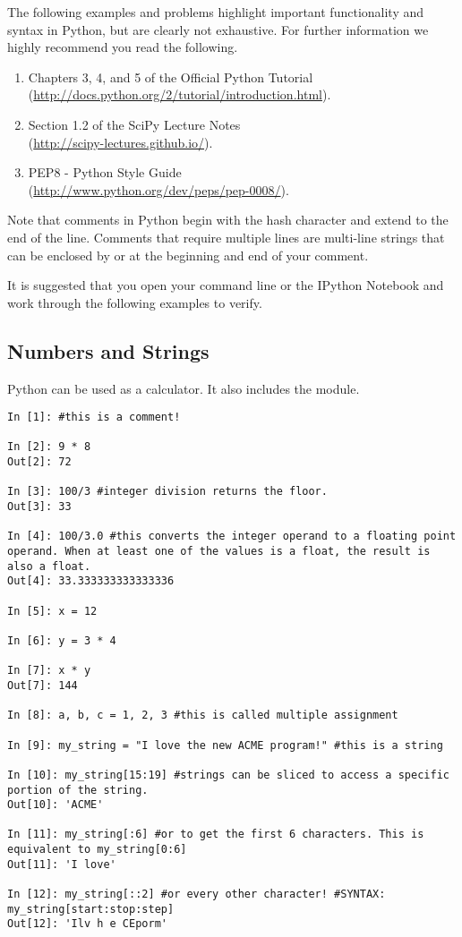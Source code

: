 The following examples and problems highlight important functionality
and syntax in Python, but are clearly not exhaustive.
For further information we highly recommend you read the following.
\begin{enumerate}
\item Chapters 3, 4, and 5 of the Official Python Tutorial \\
        (\url{http://docs.python.org/2/tutorial/introduction.html}).
\item Section 1.2 of the SciPy Lecture Notes \\
        (\url{http://scipy-lectures.github.io/}).
\item PEP8 - Python Style Guide \\
        (\url{http://www.python.org/dev/peps/pep-0008/}).
\end{enumerate}

Note that comments in Python begin with the hash character \li{#} 
and extend to the end of the line. Comments that require multiple
lines are multi-line strings that can be enclosed by  or  at the beginning 
and end of your comment. 


It is suggested that you open your command line or the IPython Notebook 
and work through the following examples to verify. 

\subsection*{Numbers and Strings}

\begin{example}
Python can be used as a calculator. It also 
includes the  module.

\begin{lstlisting}
In [1]: #this is a comment!

In [2]: 9 * 8
Out[2]: 72

In [3]: 100/3 #integer division returns the floor.
Out[3]: 33

In [4]: 100/3.0 #this converts the integer operand to a floating point operand. When at least one of the values is a float, the result is also a float. 
Out[4]: 33.333333333333336

In [5]: x = 12

In [6]: y = 3 * 4

In [7]: x * y
Out[7]: 144

In [8]: a, b, c = 1, 2, 3 #this is called multiple assignment

In [9]: my_string = "I love the new ACME program!" #this is a string

In [10]: my_string[15:19] #strings can be sliced to access a specific portion of the string.
Out[10]: 'ACME'

In [11]: my_string[:6] #or to get the first 6 characters. This is equivalent to my_string[0:6]
Out[11]: 'I love'

In [12]: my_string[::2] #or every other character! #SYNTAX: my_string[start:stop:step]
Out[12]: 'Ilv h e CEporm'

\end{lstlisting}
\end{example}

